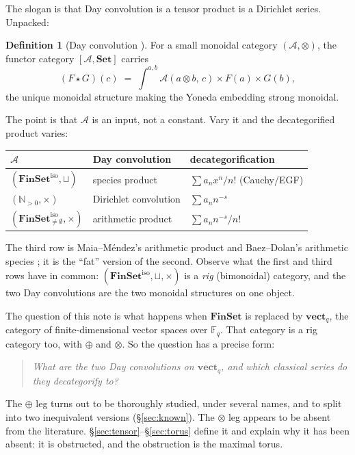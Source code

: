 \documentclass[11pt,a4paper]{article}
\theoremstyle{definition}
\newtheorem{definition}[theorem]{Definition}
\theoremstyle{remark}
\newcommand{\FF}{\mathbb{F}}
\newcommand{\NN}{\mathbb{N}}
\newcommand{\cat}[1]{\mathbf{#1}}
\newcommand{\Set}{\cat{Set}}
\newcommand{\FinSet}{\cat{FinSet}}
\newcommand{\vect}{\cat{vect}}
\newcommand{\iso}{\mathrm{iso}}
\begin{document}
The slogan is that Day convolution is a tensor product is a Dirichlet series. Unpacked:

\begin{definition}[Day convolution \cite{Day}]\label{def:day}
For a small monoidal category $(\mathcal{A},\otimes)$, the functor category
$[\mathcal{A},\Set]$ carries
\[
  (F \star G)(c) \;=\; \int^{a,b} \mathcal{A}(a \otimes b,\, c) \times F(a) \times G(b),
\]
the unique monoidal structure making the Yoneda embedding strong monoidal.
\end{definition}

The point is that $\mathcal{A}$ is an input, not a constant. Vary it and the
decategorified product varies:

\begin{center}
\small
\begin{tabular}{@{}lll@{}}
\toprule
$\mathcal{A}$ & Day convolution & decategorification \\
\midrule
$(\FinSet^{\iso}, \sqcup)$ & species product & $\sum a_n x^n/n!$ (Cauchy/EGF) \\
$(\NN_{>0}, \times)$ & Dirichlet convolution & $\sum a_n n^{-s}$ \\
$(\FinSet^{\iso}_{\neq\emptyset}, \times)$ & arithmetic product & $\sum a_n n^{-s}/n!$ \\
\bottomrule
\end{tabular}
\end{center}

\noindent
The third row is Maia--M\'endez's arithmetic product \cite{MaiaMendez} and
Baez--Dolan's arithmetic species \cite{BaezDolan}; it is the ``fat'' version of the
second. Observe what the first and third rows have in common: $(\FinSet^{\iso},\sqcup,
\times)$ is a \emph{rig} (bimonoidal) category, and the two Day convolutions are the two
monoidal structures on one object.

The question of this note is what happens when $\FinSet$ is replaced by $\vect_q$, the
category of finite-dimensional vector spaces over $\FF_q$. That category is a rig
category too, with $\oplus$ and $\otimes$. So the question has a precise form:

\begin{quote}
\emph{What are the two Day convolutions on $\vect_q$, and which classical series do they
decategorify to?}
\end{quote}

The $\oplus$ leg turns out to be thoroughly studied, under several names, and to split
into two inequivalent versions (\S\ref{sec:known}). The $\otimes$ leg appears to be
absent from the literature. \S\ref{sec:tensor}--\S\ref{sec:torus} define it and explain
why it has been absent: it is obstructed, and the obstruction is the maximal torus.
\end{document}
